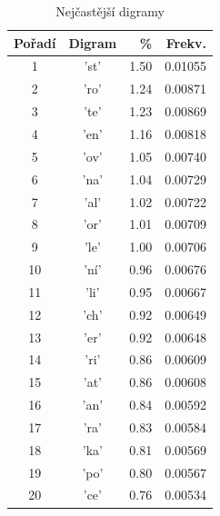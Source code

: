 \documentclass[a4paper, twoside, 12pt, czech]{article}
\begin{document}
\begin{table}[htpb]
\centering
\begin{minipage}{0.48\textwidth}
\caption{Nejčastější digramy}
\vspace{0.5cm}
\label{tab:digramy}
\begin{tabular}{|c|c|r|r|}
\hline
\textbf{Pořadí} & \textbf{Digram} & \textbf{\%} & \textbf{Frekv.} \\ \hline
1  & 'st' & 1.50 & 0.01055 \\ \hline
2  & 'ro' & 1.24 & 0.00871 \\ \hline
3  & 'te' & 1.23 & 0.00869 \\ \hline
4  & 'en' & 1.16 & 0.00818 \\ \hline
5  & 'ov' & 1.05 & 0.00740 \\ \hline
6  & 'na' & 1.04 & 0.00729 \\ \hline
7  & 'al' & 1.02 & 0.00722 \\ \hline
8  & 'or' & 1.01 & 0.00709 \\ \hline
9  & 'le' & 1.00 & 0.00706 \\ \hline
10 & 'ní' & 0.96 & 0.00676 \\ \hline
11 & 'li' & 0.95 & 0.00667 \\ \hline
12 & 'ch' & 0.92 & 0.00649 \\ \hline
13 & 'er' & 0.92 & 0.00648 \\ \hline
14 & 'ri' & 0.86 & 0.00609 \\ \hline
15 & 'at' & 0.86 & 0.00608 \\ \hline
16 & 'an' & 0.84 & 0.00592 \\ \hline
17 & 'ra' & 0.83 & 0.00584 \\ \hline
18 & 'ka' & 0.81 & 0.00569 \\ \hline
19 & 'po' & 0.80 & 0.00567 \\ \hline
20 & 'ce' & 0.76 & 0.00534 \\ \hline
\end{tabular}

\end{minipage}\hfill %
\begin{minipage}{0.48\textwidth}


\end{minipage}
\end{table}
\end{document}
